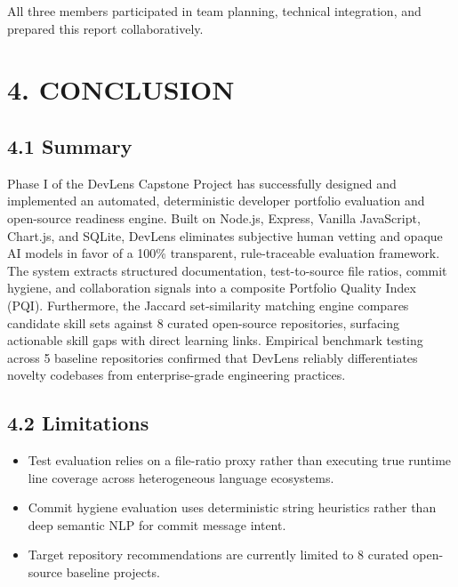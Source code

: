 \documentclass[12pt,a4paper]{article}
\begin{document}
\vspace{0.3cm}
\noindent All three members participated in team planning, technical integration, and prepared this report collaboratively.

\newpage
\thispagestyle{fancy}
\section{4. CONCLUSION}

\subsection{4.1 Summary}
Phase I of the DevLens Capstone Project has successfully designed and implemented an automated, deterministic developer portfolio evaluation and open-source readiness engine. Built on Node.js, Express, Vanilla JavaScript, Chart.js, and SQLite, DevLens eliminates subjective human vetting and opaque AI models in favor of a 100\% transparent, rule-traceable evaluation framework. The system extracts structured documentation, test-to-source file ratios, commit hygiene, and collaboration signals into a composite Portfolio Quality Index (PQI). Furthermore, the Jaccard set-similarity matching engine compares candidate skill sets against 8 curated open-source repositories, surfacing actionable skill gaps with direct learning links. Empirical benchmark testing across 5 baseline repositories confirmed that DevLens reliably differentiates novelty codebases from enterprise-grade engineering practices.

\subsection{4.2 Limitations}
\begin{itemize}
    \item Test evaluation relies on a file-ratio proxy rather than executing true runtime line coverage across heterogeneous language ecosystems.
    \item Commit hygiene evaluation uses deterministic string heuristics rather than deep semantic NLP for commit message intent.
    \item Target repository recommendations are currently limited to 8 curated open-source baseline projects.
\end{itemize}
\end{document}
